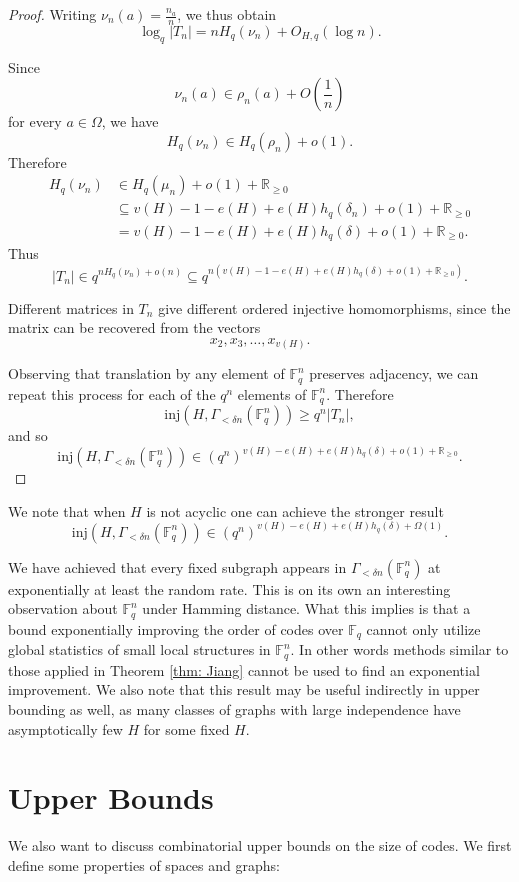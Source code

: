 \documentclass[12pt]{article}
\newcommand{\inj}{\mathrm{inj}}
\newcommand{\Fq}{\mathbb{F}_q}
\begin{document}
\begin{proof}
Writing $\nu_n(a)=\frac{n_a}{n}$, we thus obtain
\[
\log_q|T_n|=nH_q(\nu_n)+O_{H,q}(\log n).
\]

Since
\[
\nu_n(a)\in\rho_n(a)+O\left(\frac1n\right)
\]
for every $a\in\Omega$, we have
\[
H_q(\nu_n)\in H_q(\rho_n)+o(1).
\]
Therefore
\begin{align*}
H_q(\nu_n)
&\in H_q(\mu_n)+o(1)+\mathbb R_{\geq0}\\
&\subseteq v(H)-1-e(H)+e(H)h_q(\delta_n)+o(1)+\mathbb R_{\geq0}\\
&=v(H)-1-e(H)+e(H)h_q(\delta)+o(1)+\mathbb R_{\geq0}.
\end{align*}
Thus
\[
|T_n|\in q^{nH_q(\nu_n)+o(n)}\subseteq q^{n(v(H)-1-e(H)+e(H)h_q(\delta)+o(1)+\mathbb R_{\geq0})}.
\]

Different matrices in $T_n$ give different ordered injective homomorphisms,
since the matrix can be recovered from the vectors
\[
x_2,x_3,\dots,x_{v(H)}.
\]

Observing that translation by any element of $\Fq^n$ preserves
adjacency, we can repeat this process for each of the $q^n$ elements of
$\Fq^n$. Therefore
\[
\inj\left(H,\Gamma_{<\delta n}(\Fq^n)\right)\geq q^n|T_n|,
\]
and so
\[
\inj\left(H,\Gamma_{<\delta n}(\Fq^n)\right)\in (q^n)^{v(H)-e(H)+e(H)h_q(\delta)+o(1)+\mathbb R_{\geq0}}.
\]
\end{proof}

\noindent We note that when $H$ is not acyclic one can achieve the stronger result 
\[
\inj\left(H,\Gamma_{<\delta n}(\Fq^n)\right)\in (q^n)^{v(H)-e(H)+e(H)h_q(\delta)+\Omega(1)}.
\] 

We have achieved that every fixed subgraph appears in $\Gamma_{<\delta n}(\Fq^n)$ at exponentially at least the random rate. This is on its own an interesting observation about $\Fq^n$ under Hamming distance. What this implies is that a bound exponentially improving the order of codes over $\Fq$ cannot only utilize global statistics of small local structures in $\Fq^n$. In other words methods similar to those applied in Theorem \ref{thm: Jiang} cannot be used to find an exponential improvement. We also note that this result may be useful indirectly in upper bounding as well, as many classes of graphs with large independence have asymptotically few $H$ for some fixed $H$.

\section{Upper Bounds}

We also want to discuss combinatorial upper bounds on the size of codes. We first define some properties of spaces and graphs:
\end{document}
